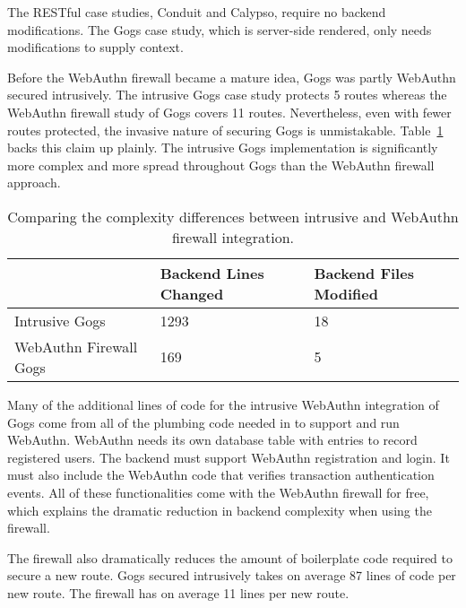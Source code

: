 The RESTful case studies, Conduit and Calypso, require no backend modifications. The Gogs case study, which is server-side rendered, only needs modifications to supply context. 

Before the WebAuthn firewall became a mature idea, Gogs was partly WebAuthn secured intrusively. The intrusive Gogs case study protects 5 routes whereas the WebAuthn firewall study of Gogs covers 11 routes. Nevertheless, even with fewer routes protected, the invasive nature of securing Gogs is unmistakable. Table~\ref{Table:EvaluationsComplexityDiffIntrusiveFirewall} backs this claim up plainly. The intrusive Gogs implementation is significantly more complex and more spread throughout Gogs than the WebAuthn firewall approach.

\begin{table}[h]
\centering

\begin{tabular}{ m{5cm} m{4.5cm} m{4.5cm}  } 
 \hline
 & Backend Lines Changed & Backend Files Modified \\ 
 \hline \hline

 Intrusive Gogs & 1293 & 18 \\ \hline

 WebAuthn Firewall Gogs & 169 & 5 \\ \hline


\end{tabular}
\caption{Comparing the complexity differences between intrusive and WebAuthn firewall integration.}
\label{Table:EvaluationsComplexityDiffIntrusiveFirewall}
\end{table}

Many of the additional lines of code for the intrusive WebAuthn integration of Gogs come from all of the plumbing code needed in to support and run WebAuthn. WebAuthn needs its own database table with entries to record registered users. The backend must support WebAuthn registration and login. It must also include the WebAuthn code that verifies transaction authentication events. All of these functionalities come with the WebAuthn firewall for free, which explains the dramatic reduction in backend complexity when using the firewall.

The firewall also dramatically reduces the amount of boilerplate code required to secure a new route. Gogs secured intrusively takes on average 87 lines of code per new route. The firewall has on average 11 lines per new route.


